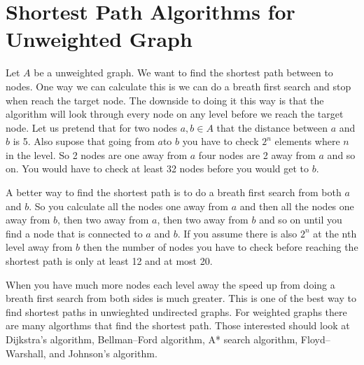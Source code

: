 \label{lab:SixDegreesKevinBacon}

\section*{Shortest Path Algorithms for Unweighted Graph}
Let $A$ be a unweighted graph. We want to find the shortest path between to nodes. One way we can calculate this is we can do a breath first search and stop when reach the target node. The downside to doing it this way is that the algorithm will look through every node on any level before we reach the target node. Let us pretend that for two nodes $a, b \in A$ that the distance between $a$ and $b$ is 5. Also supose that going from $a$to $b$ you have to check $2^n$ elements where $n$ in the level. So 2 nodes are one away from $a$ four nodes are 2 away from $a$ and so on. You would have to check at least 32 nodes before you would get to $b$.

A better way to find the shortest path is to do a breath first search from both $a$ and $b$. So you calculate all the nodes one away from $a$ and then all the nodes one away from $b$, then two away from $a$, then two away from $b$ and so on until you find a node that is connected to $a$ and $b$. If you assume there is also $2^n$ at the nth level away from $b$ then the number of nodes you have to check before reaching the shortest path is only at least 12 and at most 20.

When you have much more nodes each level away the speed up from doing a breath first search from both sides is much greater. This is one of the best way to find shortest paths in unwieghted undirected graphs. For weighted graphs there are many algorthms that find the shortest path. Those interested should look at Dijkstra's algorithm, Bellman–Ford algorithm, A* search algorithm, Floyd–Warshall, and Johnson's algorithm.


